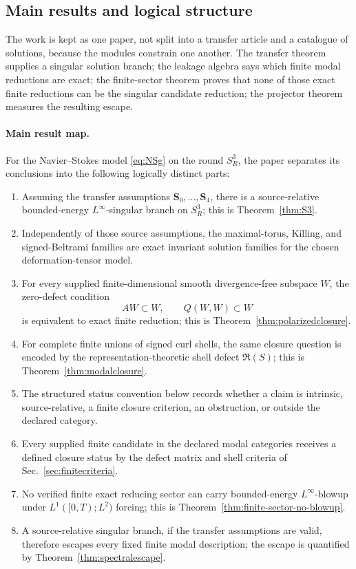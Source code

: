 \documentclass[aps,prd,reprint,superscriptaddress,nofootinbib,floatfix]{revtex4-2}
\theoremstyle{definition}
\theoremstyle{remark}
\begin{document}
\subsection{Main results and logical structure}\label{subsec:mainmap}

The work is kept as one paper, not split into a transfer article and a catalogue of solutions, because the modules constrain one another.  The transfer theorem supplies a singular solution branch; the leakage algebra says which finite modal reductions are exact; the finite-sector theorem proves that none of those exact finite reductions can be the singular candidate reduction; the projector theorem measures the resulting escape.


\paragraph*{Main result map.}
For the Navier--Stokes model \eqref{eq:NSg} on the round \(S^3_R\), the paper separates its conclusions into the following logically distinct parts:
\begin{enumerate}[label=(\roman*),leftmargin=*]
    \item Assuming the transfer assumptions \(\mathbf S_0,\ldots,\mathbf S_4\), there is a source-relative bounded-energy \(L^\infty\)-singular branch on \(S^3_R\); this is Theorem~\ref{thm:S3}.
    \item Independently of those source assumptions, the maximal-torus, Killing, and signed-Beltrami families are exact invariant solution families for the chosen deformation-tensor model.
    \item For every supplied finite-dimensional smooth divergence-free subspace \(W\), the zero-defect condition
          \[
              AW\subset W,\qquad Q(W,W)\subset W
          \]
          is equivalent to exact finite reduction; this is Theorem~\ref{thm:polarizedclosure}.
    \item For complete finite unions of signed curl shells, the same closure question is encoded by the representation-theoretic shell defect \(\mathfrak R(S)\); this is Theorem~\ref{thm:modalclosure}.
    \item The structured status convention below records whether a claim is intrinsic, source-relative, a finite closure criterion, an obstruction, or outside the declared category.
    \item Every supplied finite candidate in the declared modal categories receives a defined closure status by the defect matrix and shell criteria of Sec.~\ref{sec:finitecriteria}.
    \item No verified finite exact reducing sector can carry bounded-energy \(L^\infty\)-blowup under \(L^1([0,T);L^2)\) forcing; this is Theorem~\ref{thm:finite-sector-no-blowup}.
    \item A source-relative singular branch, if the transfer assumptions are valid, therefore escapes every fixed finite modal description; the escape is quantified by Theorem~\ref{thm:spectralescape}.
\end{enumerate}
\end{document}
